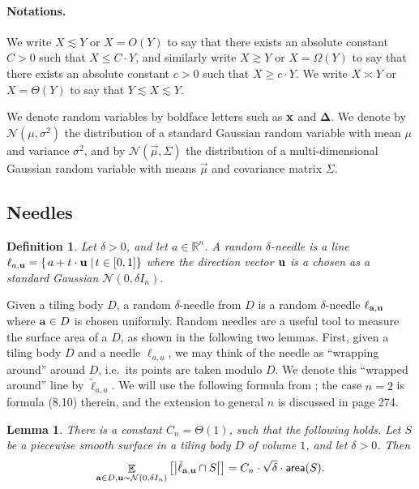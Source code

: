 \documentclass[10pt,a4paper]{article}
\newtheorem{lemma}[thm]{Lemma}
\newtheorem{definition}[thm]{Definition}
\newcommand\card[1]{\left| {#1} \right|}
\newcommand\sett[2]{\left\{ \left. #1 \;\right\vert #2 \right\}}
\newcommand\Expect[2]{{\mathop{\mathbb{E}}_{#1}\left[ {#2} \right]}}
\renewcommand\geq{\geqslant}
\renewcommand\leq{\leqslant}
\newcommand{\De}{\Delta}
\def\gg{\gtrsim}
\def\ll{\lesssim}
\def\ee{\asymp}
\begin{document}
\paragraph{Notations.}
We write $X\ll Y$ or $X = O(Y)$ to say that
there exists an absolute constant $C >0$ such that $X\leq C\cdot Y$,
and similarly write $X\gg Y$ or $X = \Omega(Y)$ to say that
there exists an absolute constant $c >0$ such that $X\geq c\cdot Y$.
We write $X\ee Y$ or $X = \Theta(Y)$ to say that $Y\ll X\ll Y$.


We denote random variables by boldface letters such as ${\bf x}$ and $\bm{\De}$.
We denote by $\mathcal{N}(\mu,\sigma^2)$ the distribution of a standard
Gaussian random variable with mean $\mu$ and variance $\sigma^2$, and by
$\mathcal{N}(\vec{\mu}, \Sigma)$ the distribution of a multi-dimensional
Gaussian random variable with means $\vec{\mu}$ and covariance matrix $\Sigma$.
\subsection{Needles}

\begin{definition}
  Let $\delta>0$, and let $a\in\mathbb{R}^n$. A random $\delta$-needle is a line $\ell_{a,{\bf u}} = \sett{a+t\cdot {\bf u}}{t\in[0,1]}$
  where the direction vector ${\bf u}$ is a chosen as a standard Gaussian $\mathcal{N}(0,\delta I_n)$.
\end{definition}

Given a tiling body $D$, a random $\delta$-needle from $D$ is a random $\delta$-needle $\ell_{{\bf a}, {\bf u}}$
where ${\bf a}\in D$ is chosen uniformly. Random needles are a useful tool to measure the surface area of a $D$, as shown
in the following two lemmas. First, given a tiling body $D$ and a needle $\ell_{a, u}$, we may think of the needle
as ``wrapping around'' around $D$,  i.e.\ its points are taken modulo $D$. We denote this ``wrapped around'' line by
$\tilde{\ell}_{a, u}$. We will use the following formula from \cite{Santalo}; the case $n=2$ is formula (8.10) therein,
and the extension to general $n$ is discussed in page 274.
\begin{lemma}\label{lem:santalo}
  There is a constant $C_n = \Theta(1)$, such that the following holds.
  Let $S$ be a piecewise smooth surface in a tiling body $D$ of volume $1$, and let $\delta>0$.
  Then
  \[
   \Expect{{\bf a}\in D, {\bf u}\sim\mathcal{N}(0,\delta I_n)}{\card{\tilde{\ell}_{{\bf a}, {\bf u}}\cap S}} = C_n \cdot\sqrt{\delta} \cdot {\sf area}(S).
  \]
\end{lemma}
\end{document}
